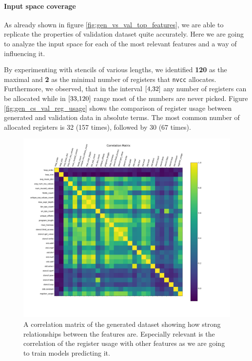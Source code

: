 \documentclass[sigplan,\review anonymous]{acmart}
\begin{document}
\paragraph{Input space coverage} As already shown in figure
\ref{fig:gen_vs_val_top_features}, we are able to replicate the properties of
validation dataset quite accurately. Here we are going to analyze the input
space for each of the most relevant features and a way of influencing it.

By experimenting with stencils of various lengths, we identified \textbf{120}
as the maximal and \textbf{2} as the minimal number of registers that
\texttt{nvcc} allocates. Furthermore, we observed, that in the interval
$\interval[{4, 32}]$ any number of registers can be allocated while in
$\interval[{33, 120}]$ range most of the numbers are never picked. Figure
\ref{fig:gen_cs_val_reg_usage} shows the comparison of register usage between
generated and validation data in absolute terms. The most common number of
allocated registers is 32 (157 times), followed by 30 (67 times).

\begin{figure}
  \centering
  \includegraphics[width=\columnwidth]{images/corr.pdf}
  \caption{A correlation matrix of the generated dataset showing how strong
  relationships between the features are. Especially relevant is the correlation
  of the register usage with other features as we are going to train models
  predicting it.}
  \label{fig:corr}
\end{figure}
\end{document}
